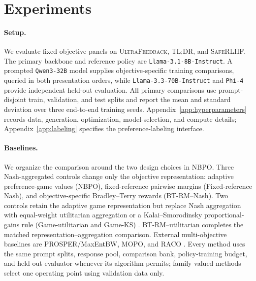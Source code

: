 \documentclass{article}
\theoremstyle{remark}
\theoremstyle{plain}
\newcommand{\NBPO}{\textsc{NBPO}}
\begin{document}
\FloatBarrier
\section{Experiments}
\label{sec:experiments}
\paragraph{Setup.}
We evaluate fixed objective panels on \textsc{UltraFeedback}, \textsc{TL;DR}, and \textsc{SafeRLHF}. The primary backbone and reference policy are \texttt{Llama-3.1-8B-Instruct}. A prompted \texttt{Qwen3-32B} model supplies objective-specific training comparisons, queried in both presentation orders, while \texttt{Llama-3.3-70B-Instruct} and \texttt{Phi-4} provide independent held-out evaluation. All primary comparisons use prompt-disjoint train, validation, and test splits and report the mean and standard deviation over three end-to-end training seeds. Appendix~\ref{app:hyperparameters} records data, generation, optimization, model-selection, and compute details; Appendix~\ref{app:labeling} specifies the preference-labeling interface.

\paragraph{Baselines.}
We organize the comparison around the two design choices in \NBPO{}. Three Nash-aggregated controls change only the objective representation: adaptive preference-game values (\NBPO{}), fixed-reference pairwise margins (Fixed-reference Nash), and objective-specific Bradley--Terry rewards (BT-RM--Nash). Two controls retain the adaptive game representation but replace Nash aggregation with equal-weight utilitarian aggregation or a Kalai--Smorodinsky proportional-gains rule (Game-utilitarian and Game-KS) \citep{kalai1975}. BT-RM--utilitarian completes the matched representation--aggregation comparison. External multi-objective baselines are PROSPER/MaxEntBW, MOPO, and RACO \citep{zhang2026prosper,agnihotri2026mopo,chen2026raco}. Every method uses the same prompt splits, response pool, comparison bank, policy-training budget, and held-out evaluator whenever its algorithm permits; family-valued methods select one operating point using validation data only.
\end{document}
